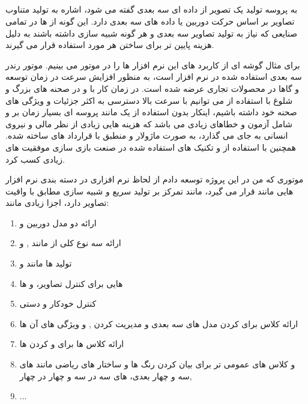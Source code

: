 \documentclass[a4paper, 12pt]{book}
\begin{document}
    \subsection*{}
     به پروسه تولید یک تصویر از داده ای سه بعدی گفته می شود،  اشاره به تولید متناوب تصاویر بر اساس حرکت دوربین یا داده های سه بعدی دارد.
    این گونه از  ها در تمامی صنایعی که نیاز به تولید تصاویر سه بعدی و هر گونه شبیه سازی داشته باشند به دلیل هزینه پایین تر برای ساختن هر  مورد استفاده قرار می گیرند.\par
     برای مثال گوشه ای از کاربرد های این نرم افزار ها را در موتور  می بینیم.  موتور رندر سه بعدی  استفاده شده در نرم افزار  است،  به منظور افزایش سرعت در زمان توسعه و گاها در محصولات تجاری عرضه شده است.
    در زمان کار با  و در صحنه های بزرگ و شلوغ با استفاده از  می توانیم با سرعت بالا دسترسی به اکثر جزئیات و ویژگی های صحنه خود داشته باشیم، اینکار بدون استفاده از  یک  مانند  پروسه ای بسیار زمان بر و شامل آزمون و خطاهای زیادی می باشد که هزینه هایی زیادی از نظر مالی و نیروی انسانی به جای می گذارد،  به صورت ماژولار و منطبق با قرارداد های  ساخته شده. همچنین    با استفاده از  و تکنیک های   استفاده شده در صنعت بازی سازی موفقیت های زیادی کسب کرد.\par
    موتوری که من در این پروژه توسعه دادم از لحاظ نرم افزاری در دسته بندی نرم افزار هایی مانند  قرار می گیرد،  مانند  تمرکز بر تولید سریع و شبیه سازی مطابق با واقیت تصاویر دارد، اجزا زیادی مانند:
    \begin{persian}
    \begin{enumerate}
      \item ارائه دو مدل دوربین   و 
      \item ارائه سه نوع کلی از  مانند ,  و 
      \item تولید  ها مانند  و 
      \item {} هایی برای کنترل تصاویر،  و  ها
      \item  کنترل خودکار و دستی 
      \item ارائه کلاس  برای  کردن مدل های سه بعدی و مدیریت کردن ,  و ویژگی های آن ها
      \item ارائه کلاس ها برای  و  کردن  ها
      \item و کلاس های عمومی تر برای بیان کردن رنگ ها و ساختار های ریاضی مانند  های سه و چهار بعدی،  های سه در سه و چهار در چهار, 
      \item ...
    \end{enumerate}
\end{persian}
\end{document}
